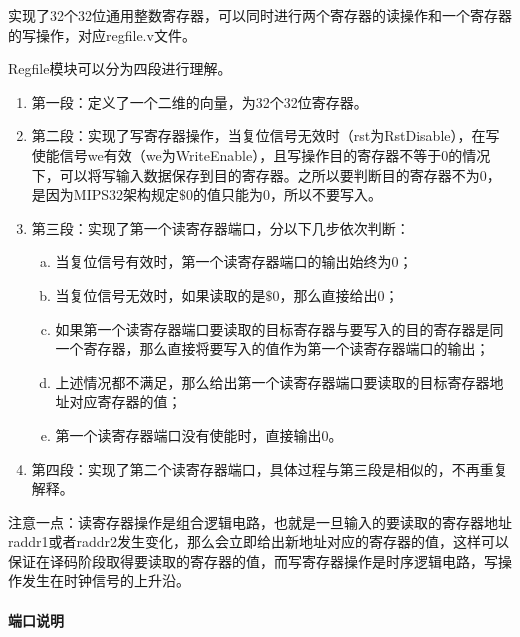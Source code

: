 \quad

实现了32个32位通用整数寄存器，可以同时进行两个寄存器的读操作和一个寄存器的写操作，对应regfile.v文件。

Regfile模块可以分为四段进行理解。
\begin{enumerate}[(1)]
	\item 第一段：定义了一个二维的向量，为32个32位寄存器。
	
	\item 第二段：实现了写寄存器操作，当复位信号无效时（rst为RstDisable），在写使能信号we有效（we为WriteEnable），且写操作目的寄存器不等于0的情况下，可以将写输入数据保存到目的寄存器。之所以要判断目的寄存器不为0，是因为MIPS32架构规定$\$$0的值只能为0，所以不要写入。
	
	\item 第三段：实现了第一个读寄存器端口，分以下几步依次判断：
	
	\begin{enumerate}[(a)]
		\item 当复位信号有效时，第一个读寄存器端口的输出始终为0；
		
		\item 当复位信号无效时，如果读取的是$\$$0，那么直接给出0；
		
		\item 如果第一个读寄存器端口要读取的目标寄存器与要写入的目的寄存器是同一个寄存器，那么直接将要写入的值作为第一个读寄存器端口的输出；
		
		\item 上述情况都不满足，那么给出第一个读寄存器端口要读取的目标寄存器地址对应寄存器的值；
		
		\item 第一个读寄存器端口没有使能时，直接输出0。
	\end{enumerate}
	
	\item 第四段：实现了第二个读寄存器端口，具体过程与第三段是相似的，不再重复解释。
\end{enumerate}

注意一点：读寄存器操作是组合逻辑电路，也就是一旦输入的要读取的寄存器地址raddr1或者raddr2发生变化，那么会立即给出新地址对应的寄存器的值，这样可以保证在译码阶段取得要读取的寄存器的值，而写寄存器操作是时序逻辑电路，写操作发生在时钟信号的上升沿。

\paragraph{端口说明}
\quad

